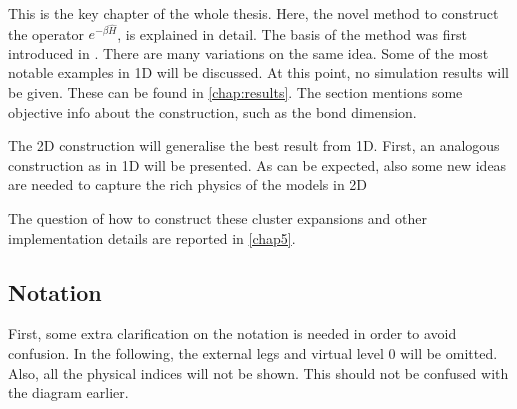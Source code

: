 This is the key chapter of the whole thesis. Here, the novel method to construct the operator $e^{-\beta \hat{H}}$, is explained in detail. The basis of the method was first introduced in \cite{Vanhecke2021}. There are many variations on the same idea. Some of the most notable examples in 1D will be discussed. At this point, no simulation results will be given. These can be found in \cref{chap:results}. The section mentions some objective info about the construction, such as the bond dimension.

The 2D construction will generalise the best result from 1D. First, an analogous construction as in 1D will be presented. As can be expected, also some new ideas are needed to capture the rich physics of the models in 2D

The question of how to construct these cluster expansions and other implementation details are reported in \cref{chap5}.

\subsection{Notation}

First, some extra clarification on the notation is needed in order to avoid confusion. In the following, the external legs and virtual level 0 will be omitted. Also, all the physical indices will not be shown. This should not be confused with the diagram earlier.

